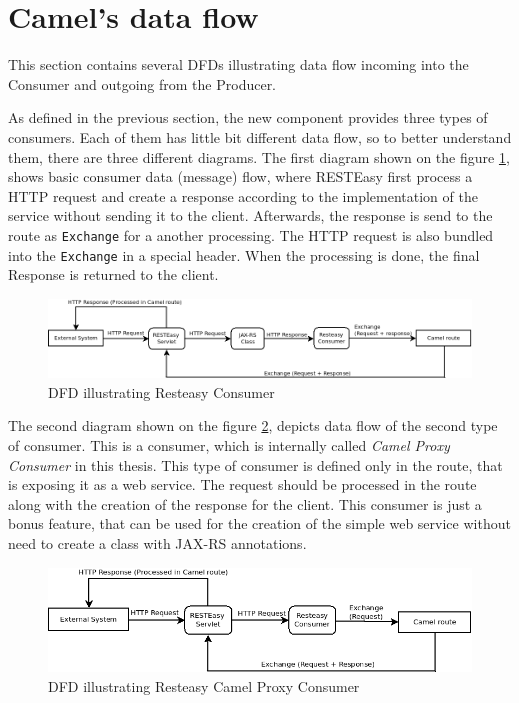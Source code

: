 \documentclass[12pt,final,oneside]{fithesis2}
\begin{document}
\section{Camel's data flow}
This section contains several DFDs illustrating data flow incoming into the Consumer and outgoing from the Producer. 

As defined in the previous section, the new component provides three types of consumers. Each of them has little bit different data flow, so to better understand them, there are three different diagrams. The first diagram shown on the figure \ref{dfd-basic}, shows basic consumer data (message) flow, where RESTEasy first process a HTTP request and create a response according to the implementation of the service without sending it to the client. Afterwards, the response is send to the route as \texttt{Exchange} for a another processing. The HTTP request is also bundled into the \texttt{Exchange} in a special header. When the processing  is done, the final Response is returned to the client. 

\begin{figure}[ht]
\advance\leftskip-2cm
\includegraphics[width=1.3\linewidth]{diagrams/basic.png}
\caption{DFD illustrating Resteasy Consumer}
\label{dfd-basic}
\end{figure}

The second diagram shown on the figure \ref{dfd-camel}, depicts data flow of the second type of consumer. This is a consumer, which is internally called \textit{Camel Proxy Consumer} in this thesis. This type of consumer is defined only in the route, that is exposing it as a web service. The request should be processed in the route along with the creation of the response for the client. This consumer is just a bonus feature, that can be used for the creation of the simple web service without need to create a class with JAX-RS annotations. 

\begin{figure}[H]
\advance\leftskip-0.5cm
\includegraphics[width=1.1\linewidth]{diagrams/camelProxy.png}
\caption{DFD illustrating Resteasy Camel Proxy Consumer}
\label{dfd-camel}
\end{figure}
\end{document}
